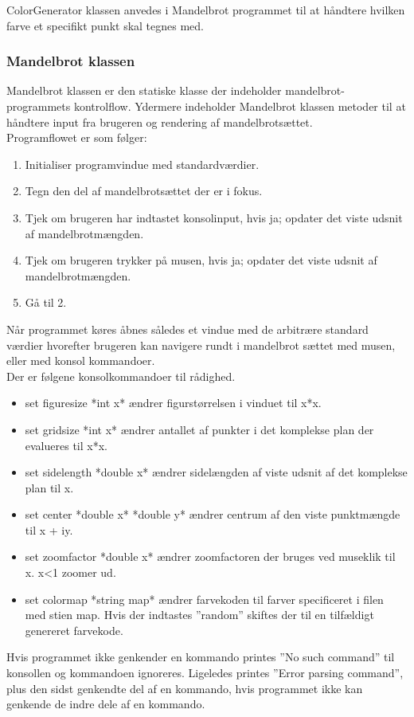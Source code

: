 ColorGenerator klassen anvedes i Mandelbrot programmet til at håndtere hvilken farve et specifikt punkt skal tegnes med.

\subsubsection{Mandelbrot klassen}
Mandelbrot klassen er den statiske klasse der indeholder mandelbrot-programmets kontrolflow. Ydermere indeholder Mandelbrot klassen metoder til at håndtere input fra brugeren og rendering af mandelbrotsættet. \\

Programflowet er som følger:
\begin{enumerate}
    \item Initialiser programvindue med standardværdier.
    \item Tegn den del af mandelbrotsættet der er i fokus.
    \item Tjek om brugeren har indtastet konsolinput, hvis ja; opdater det viste udsnit af mandelbrotmængden.
    \item Tjek om brugeren trykker på musen, hvis ja; opdater det viste udsnit af mandelbrotmængden.
    \item Gå til 2.
\end{enumerate}

Når programmet køres åbnes således et vindue med de arbitrære standard værdier hvorefter brugeren kan navigere rundt i mandelbrot sættet med musen, eller med konsol kommandoer. \\
Der er følgene konsolkommandoer til rådighed.
\begin{itemize}
    \item set figuresize *int x* ændrer figurstørrelsen i vinduet til x*x.
    \item set gridsize *int x* ændrer antallet af punkter i det komplekse plan der evalueres til x*x.
    \item set sidelength *double x* ændrer sidelængden af viste udsnit af det komplekse plan til x.
    \item set center *double x* *double y* ændrer centrum af den viste punktmængde til x + iy.
    \item set zoomfactor *double x* ændrer zoomfactoren der bruges ved museklik til x. x<1 zoomer ud.
    \item set colormap *string map* ændrer farvekoden til farver specificeret i filen med stien map. Hvis der indtastes ''random'' skiftes der til en tilfældigt genereret farvekode.
\end{itemize}
Hvis programmet ikke genkender en kommando printes ''No such command'' til konsollen og kommandoen ignoreres. Ligeledes printes ''Error parsing command'', plus den sidst genkendte del af en kommando,  hvis programmet ikke kan genkende de indre dele af en kommando.


